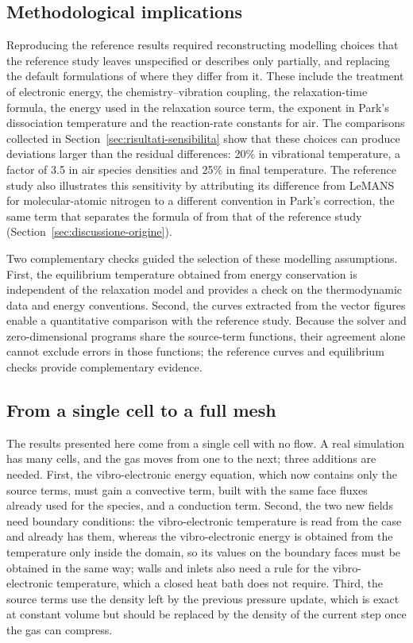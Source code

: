 \subsection{Methodological implications}
\label{sec:discussione-lezioni}

Reproducing the reference results required reconstructing modelling choices
that the reference study leaves unspecified or describes only partially, and
replacing the default formulations of \mpp{} where they differ from it.
These include the treatment of electronic energy, the chemistry--vibration
coupling, the relaxation-time formula, the energy used in the relaxation
source term, the exponent in Park's dissociation temperature and the
reaction-rate constants for air. The comparisons collected in
Section~\ref{sec:risultati-sensibilita} show that these choices can produce
deviations larger than the residual differences: 20\% in vibrational
temperature, a factor of 3.5 in air species densities and 25\% in final
temperature. The reference study also illustrates this sensitivity by
attributing its difference from LeMANS for molecular-atomic nitrogen to a
different convention in Park's correction, the same term that separates the
formula of \mpp{} from that of the reference study
(Section~\ref{sec:discussione-origine}).

Two complementary checks guided the selection of these modelling assumptions.
First, the equilibrium temperature obtained from energy conservation is
independent of the relaxation model and provides a check on the thermodynamic
data and energy conventions. Second, the curves extracted from the vector
figures enable a quantitative comparison with the reference study. Because the
solver and zero-dimensional programs share the source-term functions, their
agreement alone cannot exclude errors in those functions; the reference
curves and equilibrium checks provide complementary
evidence.

\subsection{From a single cell to a full mesh}
\label{sec:discussione-multicella}

The results presented here come from a single cell with no flow. A real
simulation has many cells, and the gas moves from one to the next; three
additions are needed. First, the vibro-electronic energy equation, which now
contains only the source terms, must gain a convective term, built with the
same face fluxes already used for the species, and a conduction term. Second,
the two new fields need boundary conditions: the vibro-electronic temperature
is read from the case and already has them, whereas the vibro-electronic
energy is obtained from the temperature only inside the domain, so its values
on the boundary faces must be obtained in the same way; walls and inlets also
need a rule for the vibro-electronic temperature, which a closed heat bath
does not require. Third, the source terms use the density left by the previous
pressure update, which is exact at constant volume but should be replaced by
the density of the current step once the gas can compress.
